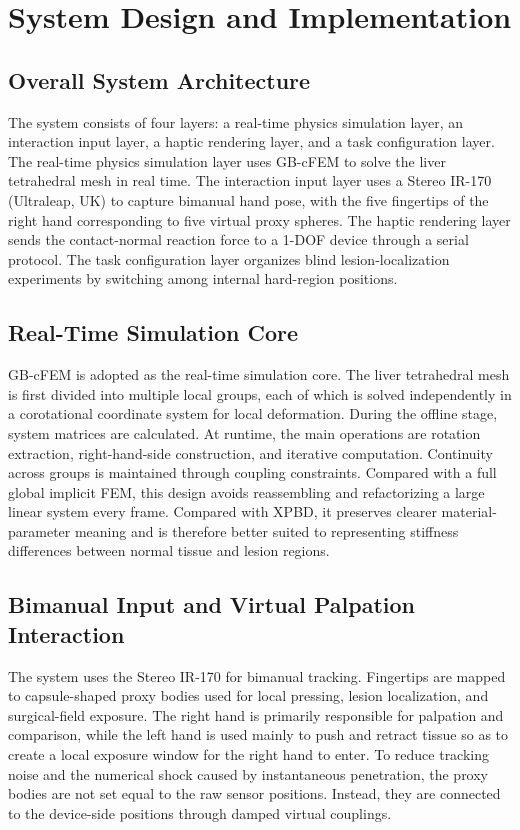 \documentclass{ieeeaccess}
\begin{document}
\section{System Design and Implementation}
\subsection{Overall System Architecture}
The system consists of four layers: a real-time physics simulation layer, an interaction input layer, a haptic rendering layer, and a task configuration layer. The real-time physics simulation layer uses GB-cFEM to solve the liver tetrahedral mesh in real time. The interaction input layer uses a Stereo IR-170 (Ultraleap, UK) to capture bimanual hand pose, with the five fingertips of the right hand corresponding to five virtual proxy spheres. The haptic rendering layer sends the contact-normal reaction force to a 1-DOF device through a serial protocol. The task configuration layer organizes blind lesion-localization experiments by switching among internal hard-region positions.

\subsection{Real-Time Simulation Core}
GB-cFEM is adopted as the real-time simulation core. The liver tetrahedral mesh is first divided into multiple local groups, each of which is solved independently in a corotational coordinate system for local deformation. During the offline stage, system matrices are calculated. At runtime, the main operations are rotation extraction, right-hand-side construction, and iterative computation. Continuity across groups is maintained through coupling constraints. Compared with a full global implicit FEM, this design avoids reassembling and refactorizing a large linear system every frame. Compared with XPBD, it preserves clearer material-parameter meaning and is therefore better suited to representing stiffness differences between normal tissue and lesion regions.

\subsection{Bimanual Input and Virtual Palpation Interaction}
The system uses the Stereo IR-170 for bimanual tracking. Fingertips are mapped to capsule-shaped proxy bodies used for local pressing, lesion localization, and surgical-field exposure. The right hand is primarily responsible for palpation and comparison, while the left hand is used mainly to push and retract tissue so as to create a local exposure window for the right hand to enter. To reduce tracking noise and the numerical shock caused by instantaneous penetration, the proxy bodies are not set equal to the raw sensor positions. Instead, they are connected to the device-side positions through damped virtual couplings.
\end{document}
